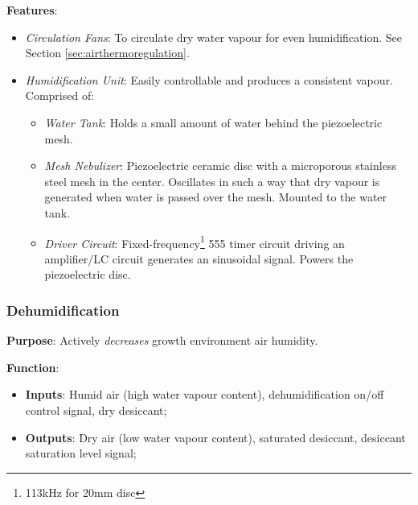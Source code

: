 \textbf{Features}:
\begin{itemize}
    \item \textit{Circulation Fans}: To circulate dry water vapour for even humidification. See Section \ref{sec:airthermoregulation}.
    \item \textit{Humidification Unit}: Easily controllable and produces a consistent vapour. Comprised of:
    \begin{itemize}
        \item \textit{Water Tank}: Holds a small amount of water behind the piezoelectric mesh.
        \item \textit{Mesh Nebulizer}: Piezoelectric ceramic disc with a microporous stainless steel mesh in the center. Oscillates in such a way that dry vapour is generated when water is passed over the mesh. Mounted to the water tank.
        \item \textit{Driver Circuit}: Fixed-frequency\footnote{113kHz for 20mm disc} 555 timer circuit driving an amplifier/LC circuit generates an sinusoidal signal. Powers the piezoelectric disc.
    \end{itemize}
\end{itemize}

\clearpage

\subsubsection{Dehumidification}
\label{sec:dehumidification}

\textbf{Purpose}: Actively \textit{decreases} growth environment air humidity.

\textbf{Function}:
\begin{itemize}
    \item \textbf{Inputs}: Humid air (high water vapour content), dehumidification on/off control signal, dry desiccant;
    \item \textbf{Outputs}: Dry air (low water vapour content), saturated desiccant, desiccant saturation level signal;
\end{itemize}

